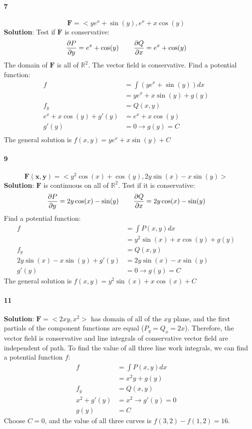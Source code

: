 \documentclass{article}
\newcommand{\parf}[2]{\frac{\partial #1}{\partial #2}}
\begin{document}
    \paragraph{7}
    \[\mathbf{F}=<ye^x + \sin(y), e^x + x\cos(y)\]
    \textbf{Solution}: Test if $\mathbf{F}$ is conservative:
    \[\parf{P}{y} = e^x + \cos(y) \hspace{0.3in} \parf{Q}{x} = e^x + \cos(y)\]
    The domain of $\mathbf{F}$ is all of $\mathbb{R}^2$.
    The vector field is conservative. Find a potential function:
    \begin{align*}
        f &= \int (ye^{x} + \sin(y))dx \\
        &= ye^{x} + x\sin(y) + g(y) \\
        f_y &= Q(x,y)\\
        e^{x} + x\cos(y) +g'(y) &= e^x + x\cos(y) \\
        g'(y) &= 0 \rightarrow g(y) = C \\
    \end{align*}
    The general solution is $f(x,y) = ye^{x} + x\sin(y) + C$

    \paragraph{9}
    \[\mathbf{F(x,y)}=<y^{2}\cos(x) + \cos(y), 2y\sin(x)-x\sin(y)>\]
    \textbf{Solution}: $\mathbf{F}$ is continuous on all of $\mathbb{R}^2$. Test if it is conservative:
    \[ \parf{P}{y} = 2y\cos(x)-\sin(y) \hspace{0.3in} \parf{Q}{x} = 2y\cos(x)-\sin(y)\]
    Find a potential function:
    \begin{align*}
        f &= \int P(x,y) dx \\
        &= y^{2}\sin(x) +x\cos(y) + g(y) \\
        f_y &= Q(x,y)\\
        2y\sin(x) -x\sin(y) + g'(y) &= 2y\sin(x) - x\sin(y) \\
        g'(y) &= 0 \rightarrow g(y) = C
    \end{align*}
    The general solution is $f(x,y) = y^{2}\sin(x) + x\cos(x) + C$

    \paragraph{11} \textbf{Solution}: $\mathbf{F}=<2xy, x^2>$ has domain of all of the $xy$ plane, and the first partials of the
    component functions are equal ($P_y = Q_x = 2x$).
    Therefore, the vector field is conservative and line integrals of conservative vector field are independent of path. To find the value of all three
    line work integrals, we can find a potential function $f$:
    \begin{align*}
        f &= \int P(x,y)dx \\
        &= x^{2}y + g(y)\\
        f_y &= Q(x,y) \\
        x^2 + g'(y) &= x^2 \rightarrow g'(y) = 0 \\
        g(y) &= C
    \end{align*}
    Choose $C=0$, and the value of all three curves is $f(3,2)-f(1,2)=16$.
\end{document}
